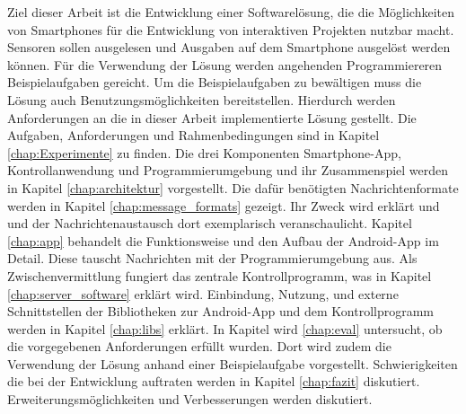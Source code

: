 \documentclass[11pt,a4paper]{report}
\begin{document}
Ziel dieser Arbeit ist die Entwicklung einer Softwarelösung, die die Möglichkeiten von Smartphones für die Entwicklung von interaktiven Projekten nutzbar macht.
Sensoren sollen ausgelesen und Ausgaben auf dem Smartphone ausgelöst werden können.
Für die Verwendung der Lösung werden angehenden Programmiereren Beispielaufgaben gereicht.
Um die Beispielaufgaben zu bewältigen muss die Lösung auch Benutzungsmöglichkeiten bereitstellen.
Hierdurch werden Anforderungen an die in dieser Arbeit implementierte Lösung gestellt.
Die Aufgaben, Anforderungen und Rahmenbedingungen sind in Kapitel \ref{chap:Experimente} zu finden.
Die drei Komponenten Smartphone-App, Kontrollanwendung und Programmierumgebung und ihr Zusammenspiel werden
in Kapitel \ref{chap:architektur} vorgestellt.
Die dafür benötigten Nachrichtenformate werden in Kapitel \ref{chap:message_formats} gezeigt.
Ihr Zweck wird erklärt und und der Nachrichtenaustausch dort exemplarisch veranschaulicht.
Kapitel \ref{chap:app} behandelt die Funktionsweise und den Aufbau der Android-App im Detail.
Diese tauscht Nachrichten mit der Programmierumgebung aus.
Als Zwischenvermittlung fungiert das zentrale Kontrollprogramm, was in Kapitel \ref{chap:server_software} erklärt wird.
Einbindung, Nutzung, und externe Schnittstellen der Bibliotheken zur Android-App und dem Kontrollprogramm werden in Kapitel \ref{chap:libs} erklärt.
In Kapitel wird \ref{chap:eval} untersucht, ob die vorgegebenen Anforderungen erfüllt wurden.
Dort wird zudem die Verwendung der Lösung anhand einer Beispielaufgabe vorgestellt.
Schwierigkeiten die bei der Entwicklung auftraten werden in Kapitel \ref{chap:fazit} diskutiert.
Erweiterungsmöglichkeiten und Verbesserungen werden diskutiert.
\end{document}
